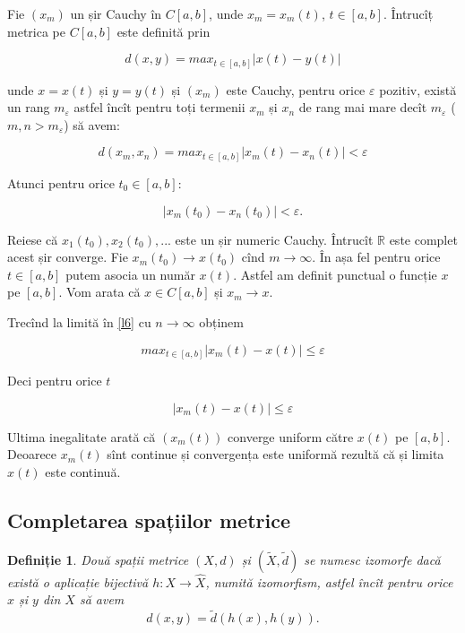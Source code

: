 \documentclass[a4paper,12pt]{article}
\theoremstyle{change}
\newtheorem{definition}[theorem]{Definiție}
\newenvironment{proof}[1][Proof]{\begin{trivlist}
\item[\hskip \labelsep {\bfseries #1}]}{\end{trivlist}}
\begin{document}
\begin{proof}
Fie $(x_m)$ un șir Cauchy în $C[a,b]$, unde $x_m=x_m(t)$, $t\in [a,b]$. Întrucîț metrica pe $C[a,b]$ este definită prin

\[
  d(x,y) = max_{t\in [a,b]} |x(t)-y(t)|
\]

\noindent unde $x=x(t)$ și $y=y(t)$ și $(x_m)$ este Cauchy, pentru orice $\varepsilon$ pozitiv, există un rang $m_{\varepsilon}$ astfel încît pentru toți termenii $x_m$ și $x_n$ de rang mai mare decît $m_{\varepsilon}$ ($m,n>m_{\varepsilon}$) să avem:

\[
\label{l6}
d(x_m,x_n) = max_{t\in [a,b]} |x_m(t)-x_n(t)|<\varepsilon
\]

Atunci pentru orice $t_0\in [a,b]$:

\[
|x_m(t_0)-x_n(t_0)|<\varepsilon.
\]

Reiese că $x_1(t_0),x_2(t_0),...$ este un șir numeric Cauchy. Întrucît $\mathbb{R}$ este complet acest șir converge. Fie $x_m(t_0)\to x(t_0)$ cînd $m\to\infty$. În așa fel pentru orice $t\in[a,b]$ putem asocia un număr $x(t)$. Astfel am definit punctual o funcție $x$ pe $[a,b]$. Vom arata că $x\in C[a,b]$ și $x_m\to x$.

Trecînd la limită în \eqref{l6} cu $n\to\infty$ obținem

\[
max_{t\in [a,b]} |x_m(t)-x(t)|\leq \varepsilon
\]

Deci pentru orice $t$

\[
|x_m(t)-x(t)|\leq \varepsilon
\]

Ultima inegalitate arată că $(x_m(t))$ converge uniform către $x(t)$ pe $[a,b]$. Deoarece $x_m(t)$ sînt continue și convergența este uniformă rezultă că și limita $x(t)$ este continuă.
\end{proof}



\subsection{Completarea spațiilor metrice}

\begin{definition}
Două spații metrice $(X,d)$ și $(\tilde{X}, \tilde{d})$ se numesc \emph{izomorfe} dacă există o aplicație bijectivă $h:X\longrightarrow \hat{X}$, numită \emph{izomorfism}, astfel încît pentru orice $x$ și $y$ din $X$ să avem 
\[
	d(x,y)=\tilde{d}(h(x),h(y)).
\]
\end{definition}
\end{document}
